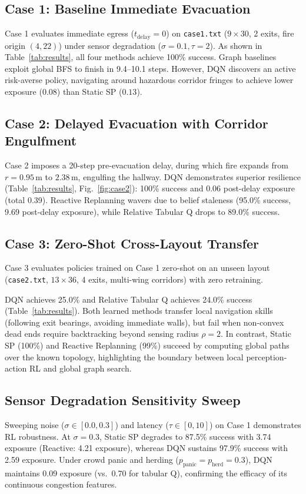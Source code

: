 \documentclass[10pt,twocolumn]{article}
\begin{document}
\subsection{Case 1: Baseline Immediate Evacuation}
Case 1 evaluates immediate egress ($t_{\mathrm{delay}} = 0$) on \texttt{case1.txt} ($9 \times 30$, 2 exits, fire origin $(4, 22)$) under sensor degradation ($\sigma = 0.1, \tau = 2$). As shown in Table~\ref{tab:results}, all four methods achieve 100\% success. Graph baselines exploit global BFS to finish in 9.4--10.1 steps. However, DQN discovers an active risk-averse policy, navigating around hazardous corridor fringes to achieve lower exposure ($0.08$) than Static SP ($0.13$).

\subsection{Case 2: Delayed Evacuation with Corridor Engulfment}
Case 2 imposes a 20-step pre-evacuation delay, during which fire expands from $r=0.95\,\mathrm{m}$ to $2.38\,\mathrm{m}$, engulfing the hallway. DQN demonstrates superior resilience (Table~\ref{tab:results}, Fig.~\ref{fig:case2}): 100\% success and 0.06 post-delay exposure (total 0.39). Reactive Replanning wavers due to belief staleness (95.0\% success, 9.69 post-delay exposure), while Relative Tabular Q drops to 89.0\% success.

\subsection{Case 3: Zero-Shot Cross-Layout Transfer}
Case 3 evaluates policies trained on Case 1 zero-shot on an unseen layout (\texttt{case2.txt}, $13 \times 36$, 4 exits, multi-wing corridors) with zero retraining.

DQN achieves 25.0\% and Relative Tabular Q achieves 24.0\% success (Table~\ref{tab:results}). Both learned methods transfer local navigation skills (following exit bearings, avoiding immediate walls), but fail when non-convex dead ends require backtracking beyond sensing radius $\rho{=}2$. In contrast, Static SP (100\%) and Reactive Replanning (99\%) succeed by computing global paths over the known topology, highlighting the boundary between local perception-action RL and global graph search.

\subsection{Sensor Degradation Sensitivity Sweep}
Sweeping noise ($\sigma \in [0.0, 0.3]$) and latency ($\tau \in [0, 10]$) on Case 1 demonstrates RL robustness. At $\sigma = 0.3$, Static SP degrades to 87.5\% success with 3.74 exposure (Reactive: 4.21 exposure), whereas DQN sustains 97.9\% success with 2.59 exposure. Under crowd panic and herding ($p_{\mathrm{panic}} = p_{\mathrm{herd}} = 0.3$), DQN maintains 0.09 exposure (vs.\ 0.70 for tabular Q), confirming the efficacy of its continuous congestion features.
\end{document}
